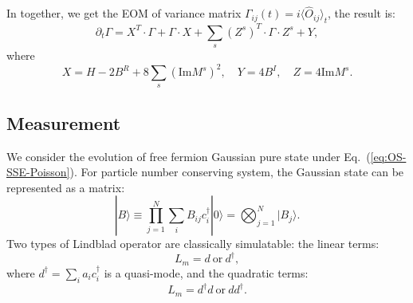 \documentclass[aps,prb,superscriptaddress,nofootinbib]{revtex4}
\begin{document}
In together, we get the EOM of variance matrix $\Gamma_{ij}(t)=i\langle\hat O_{ij}\rangle_t$, the result is:
\begin{equation}
	\partial_t \Gamma = X^T\cdot\Gamma + \Gamma \cdot X + \sum_s (Z^s)^T \cdot \Gamma\cdot Z^s + Y,
\end{equation}
where
\begin{equation}
	X = H - 2B^R + 8 \sum_s (\mathrm{Im} M^s)^2, \quad
	Y = 4B^I, \quad 
	Z = 4 \mathrm{Im} M^s.
\end{equation}


\subsection{Measurement}
We consider the evolution of free fermion Gaussian pure state under Eq.~(\ref{eq:OS-SSE-Poisson}).
For particle number conserving system, the Gaussian state can be represented as a matrix:
\begin{equation}
	|B\rangle \equiv \prod_{j=1}^N \sum_i B_{ij} c_{i}^\dagger |0\rangle = \bigotimes_{j=1}^N |B_j\rangle.
\end{equation}
Two types of Lindblad operator are classically simulatable: the linear terms:
\begin{equation}
	L_m = d \ \text{or}\ d^\dagger,
\end{equation}
where $d^\dagger = \sum_i a_{i} c_i^\dagger$ is a quasi-mode, and the quadratic terms:
\begin{equation}
	L_m = d^\dagger d \ \text{or}\ d d^\dagger.
\end{equation}
\end{document}
